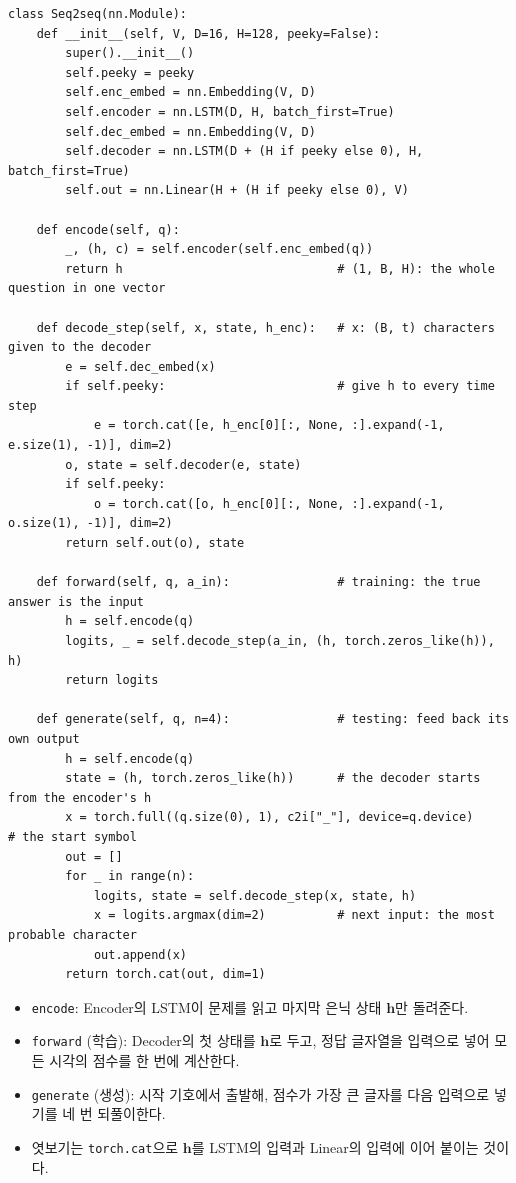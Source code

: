 \documentclass[11pt,a4paper]{article}
\newcommand{\vect}[1]{\bm{#1}}
\begin{document}
\begin{lstlisting}
class Seq2seq(nn.Module):
    def __init__(self, V, D=16, H=128, peeky=False):
        super().__init__()
        self.peeky = peeky
        self.enc_embed = nn.Embedding(V, D)
        self.encoder = nn.LSTM(D, H, batch_first=True)
        self.dec_embed = nn.Embedding(V, D)
        self.decoder = nn.LSTM(D + (H if peeky else 0), H, batch_first=True)
        self.out = nn.Linear(H + (H if peeky else 0), V)

    def encode(self, q):
        _, (h, c) = self.encoder(self.enc_embed(q))
        return h                              # (1, B, H): the whole question in one vector

    def decode_step(self, x, state, h_enc):   # x: (B, t) characters given to the decoder
        e = self.dec_embed(x)
        if self.peeky:                        # give h to every time step
            e = torch.cat([e, h_enc[0][:, None, :].expand(-1, e.size(1), -1)], dim=2)
        o, state = self.decoder(e, state)
        if self.peeky:
            o = torch.cat([o, h_enc[0][:, None, :].expand(-1, o.size(1), -1)], dim=2)
        return self.out(o), state

    def forward(self, q, a_in):               # training: the true answer is the input
        h = self.encode(q)
        logits, _ = self.decode_step(a_in, (h, torch.zeros_like(h)), h)
        return logits

    def generate(self, q, n=4):               # testing: feed back its own output
        h = self.encode(q)
        state = (h, torch.zeros_like(h))      # the decoder starts from the encoder's h
        x = torch.full((q.size(0), 1), c2i["_"], device=q.device)     # the start symbol
        out = []
        for _ in range(n):
            logits, state = self.decode_step(x, state, h)
            x = logits.argmax(dim=2)          # next input: the most probable character
            out.append(x)
        return torch.cat(out, dim=1)
\end{lstlisting}

\begin{itemize}[leftmargin=1.5em]
\item \texttt{encode}: Encoder의 LSTM이 문제를 읽고 마지막 은닉 상태 $\vect h$만 돌려준다.
\item \texttt{forward} (학습): Decoder의 첫 상태를 $\vect h$로 두고, 정답 글자열을 입력으로 넣어 모든 시각의 점수를 한 번에 계산한다.
\item \texttt{generate} (생성): 시작 기호에서 출발해, 점수가 가장 큰 글자를 다음 입력으로 넣기를 네 번 되풀이한다.
\item 엿보기는 \texttt{torch.cat}으로 $\vect h$를 LSTM의 입력과 Linear의 입력에 이어 붙이는 것이다.
\end{itemize}
\end{document}
